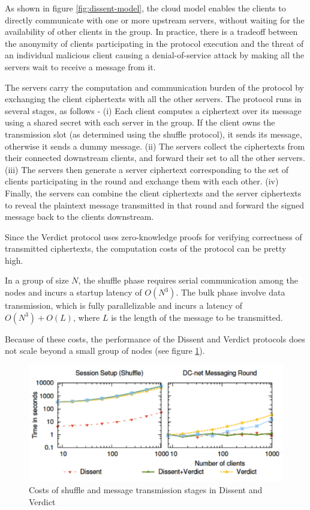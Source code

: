 As shown in figure \ref{fig:dissent-model}, the cloud model enables the clients to directly communicate with one or more upstream servers, without waiting for the availability of other clients in the group. In practice, there is a tradeoff between the anonymity of clients participating in the protocol execution and the threat of an individual malicious client causing a denial-of-service attack by making all the servers wait to receive a message from it.

The servers carry the computation and communication burden of the protocol by exchanging the client ciphertexts with all the other servers. The protocol runs in several stages, as follows - (i) Each client computes a ciphertext over its message using a shared secret with each server in the group. If the client owns the transmission slot (as determined using the shuffle protocol), it sends its message, otherwise it sends a dummy message. (ii) The servers collect the ciphertexts from their connected downstream clients, and forward their set to all the other servers. (iii) The servers then generate a server ciphertext corresponding to the set of clients participating in the round and exchange them with each other. (iv) Finally, the servers can combine the client ciphertexts and the server ciphertexts to reveal the plaintext message transmitted in that round and forward the signed message back to the clients downstream.

Since the Verdict protocol uses zero-knowledge proofs for verifying correctness of transmitted ciphertexts, the computation costs of the protocol can be pretty high.

In a group of size $N$, the shuffle phase requires serial communication among the nodes and incurs a startup latency of $O(N^3)$. The bulk phase involve data transmission, which is fully parallelizable and incurs a latency of $O(N^3) + O(L)$, where $L$ is the length of the message to be transmitted.

Because of these costs, the performance of the Dissent and Verdict protocols does not scale beyond a small group of nodes (see figure \ref{fig:dissent-verdict-perf}).

\begin{figure}
\centering
\includegraphics[width=0.9\linewidth]{dissent-verdict-perf}
\caption{Costs of shuffle and message transmission stages in Dissent and Verdict}
\label{fig:dissent-verdict-perf}
\end{figure}

